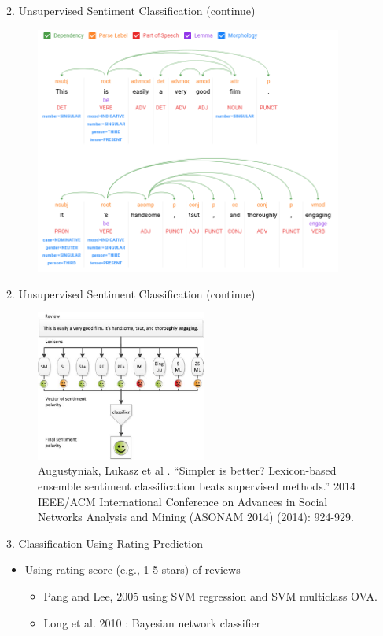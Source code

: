 \documentclass[xcolor=table]{beamer}
\begin{document}
\begin{frame}{2. Unsupervised Sentiment Classification (continue)}
    \begin{figure}
        \centering
        \includegraphics[width=0.9\textwidth]{img/lexi-parse.PNG}
    \end{figure}
\end{frame}


\begin{frame}{2. Unsupervised Sentiment Classification (continue)}
    \begin{figure}
        \centering
        \includegraphics[width=0.5\textwidth]{img/lexi.png}
        \caption{Augustyniak, Lukasz et al \cite{Augustyniak2014SimplerIB}. “Simpler is better? Lexicon-based ensemble sentiment classification beats supervised methods.” 2014 IEEE/ACM International Conference on Advances in Social Networks Analysis and Mining (ASONAM 2014) (2014): 924-929.}
    \end{figure}
\end{frame}


\begin{frame}{3. Classification Using Rating Prediction}
    \begin{itemize}
        \item Using rating score (e.g., 1-5 stars) of reviews
        \begin{itemize}
            \item Pang and Lee, 2005 \cite{pang2005seeing} using SVM regression and SVM multiclass OVA.
            \item Long et al. 2010 \cite{long2010review}: Bayesian network classifier
        \end{itemize}
    \end{itemize}
\end{frame}
\end{document}

